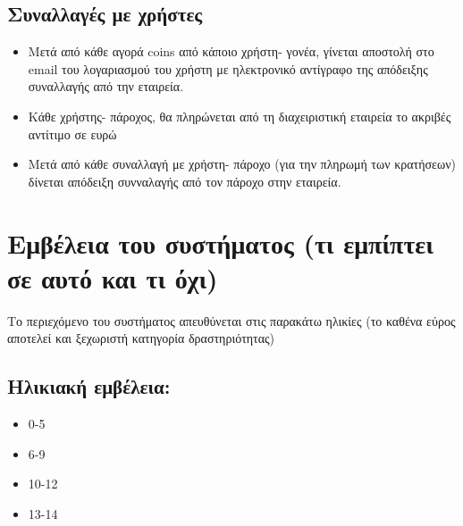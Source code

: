 \documentclass[letterpaper,6pt]{article}
\begin{document}

\subsection{Συναλλαγές με χρήστες}
\begin{itemize}
  \item Μετά από κάθε αγορά coins από κάποιο χρήστη- γονέα, γίνεται αποστολή στο email του λογαριασμού του χρήστη με ηλεκτρονικό αντίγραφο της απόδειξης συναλλαγής από την εταιρεία.
  \item Κάθε χρήστης- πάροχος, θα πληρώνεται από τη διαχειριστική εταιρεία το ακριβές αντίτιμο σε ευρώ
  \item Μετά από κάθε συναλλαγή με χρήστη- πάροχο (για την πληρωμή των κρατήσεων) δίνεται απόδειξη συνναλαγής από τον πάροχο στην εταιρεία.
\end{itemize}


\section{Εμβέλεια του συστήματος (τι εμπίπτει σε αυτό και τι όχι)}
Το περιεχόμενο του συστήματος απευθύνεται στις παρακάτω ηλικίες (το καθένα εύρος αποτελεί και ξεχωριστή κατηγορία δραστηριότητας)
\subsection{Ηλικιακή εμβέλεια:}
\begin{itemize}
  \item 0-5
  \item 6-9
  \item 10-12
  \item 13-14
\end{itemize}
\end{document}
